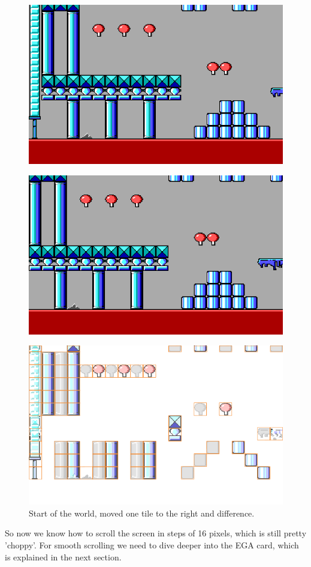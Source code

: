 \documentclass[book.tex]{subfiles}
\begin{document}
\pagebreak
\begin{figure}[H] 
  \centering 
  \includegraphics[width=.6\textwidth, frame]{screenshots_300dpi/game/keen-screen1.png}
\end{figure}
\begin{figure}[H] 
  \centering 
  \includegraphics[width=.6\textwidth, frame]{screenshots_300dpi/game/keen-screen2.png}
\end{figure}
\begin{figure}[H] 
  \centering 
  \includegraphics[width=.6\textwidth, frame]{screenshots_300dpi/game/keen-difference.png}
  \caption{Start of the world, moved one tile to the right and difference.}
  \label{fig:keen_difference}
\end{figure}
\pagebreak

So now we know how to scroll the screen in steps of 16 pixels, which is still pretty 'choppy'. For smooth scrolling we need to dive deeper into the EGA card, which is explained in the next section.\\
\end{document}
